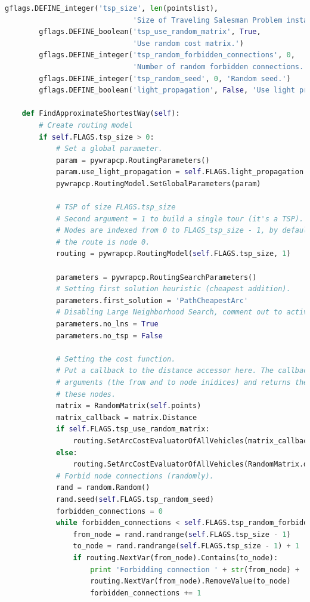 \documentclass{article}
\begin{document}
\begin{lstlisting}[language=Python]
        gflags.DEFINE_integer('tsp_size', len(pointslist),
                              'Size of Traveling Salesman Problem instance.')
        gflags.DEFINE_boolean('tsp_use_random_matrix', True,
                              'Use random cost matrix.')
        gflags.DEFINE_integer('tsp_random_forbidden_connections', 0,
                              'Number of random forbidden connections.')
        gflags.DEFINE_integer('tsp_random_seed', 0, 'Random seed.')
        gflags.DEFINE_boolean('light_propagation', False, 'Use light propagation')

    def FindApproximateShortestWay(self):
        # Create routing model
        if self.FLAGS.tsp_size > 0:
            # Set a global parameter.
            param = pywrapcp.RoutingParameters()
            param.use_light_propagation = self.FLAGS.light_propagation
            pywrapcp.RoutingModel.SetGlobalParameters(param)

            # TSP of size FLAGS.tsp_size
            # Second argument = 1 to build a single tour (it's a TSP).
            # Nodes are indexed from 0 to FLAGS_tsp_size - 1, by default the start of
            # the route is node 0.
            routing = pywrapcp.RoutingModel(self.FLAGS.tsp_size, 1)

            parameters = pywrapcp.RoutingSearchParameters()
            # Setting first solution heuristic (cheapest addition).
            parameters.first_solution = 'PathCheapestArc'
            # Disabling Large Neighborhood Search, comment out to activate it.
            parameters.no_lns = True
            parameters.no_tsp = False

            # Setting the cost function.
            # Put a callback to the distance accessor here. The callback takes two
            # arguments (the from and to node inidices) and returns the distance between
            # these nodes.
            matrix = RandomMatrix(self.points)
            matrix_callback = matrix.Distance
            if self.FLAGS.tsp_use_random_matrix:
                routing.SetArcCostEvaluatorOfAllVehicles(matrix_callback)
            else:
                routing.SetArcCostEvaluatorOfAllVehicles(RandomMatrix.distance)
            # Forbid node connections (randomly).
            rand = random.Random()
            rand.seed(self.FLAGS.tsp_random_seed)
            forbidden_connections = 0
            while forbidden_connections < self.FLAGS.tsp_random_forbidden_connections:
                from_node = rand.randrange(self.FLAGS.tsp_size - 1)
                to_node = rand.randrange(self.FLAGS.tsp_size - 1) + 1
                if routing.NextVar(from_node).Contains(to_node):
                    print 'Forbidding connection ' + str(from_node) + ' -> ' + str(to_node)
                    routing.NextVar(from_node).RemoveValue(to_node)
                    forbidden_connections += 1


\end{lstlisting}
\end{document}

